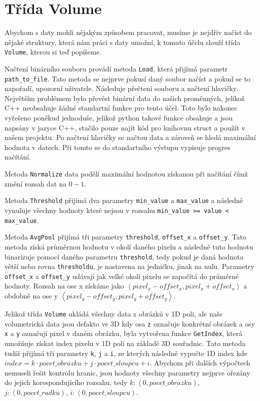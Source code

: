 \section{Třída Volume}
Abychom s daty mohli nějakým způsobem pracovat, musíme je nejdřív načíst do nějaké struktury, která nám práci s daty umožní, k tomuto účelu slouží třída \verb|Volume|, kterou si teď popíšeme.

Načtení binárního souboru provádí metoda \verb|Load|, která přijímá parametr \verb|path_to_file|. Tato metoda se nejprve pokusí daný soubor načíst a pokud se to napořadí, upozorní uživatele. Následuje přečtení souboru a načtení hlavičky. Největším problémem bylo převést binární data do našich proměnných, jelikož C++ neobsahuje žádné standartní funkce pro tento účel. Toto bylo nakonec vyřešeno poněkud jednoduše, jelikož python takové funkce obsahuje a jsou napsány v jazyce C++, stačilo pouze najít kód pro knihovnu struct a použít v našem projektu. Po načtení hlavičky se načtou data a zároveň se hledá maximální hodnota v datech. Při tomto se do standartního výstupu vypisuje progres načítání.

Metoda \verb|Normalize| data podělí maximální hodnotou získanou při načítání čímž změní rozsah dat na $0-1$.

Metoda \verb|Threshold| přijímá dva parametry \verb|min_value| a \verb|max_value| a následně vynuluje všechny hodnoty které nejsou v rozsahu \verb|min_value >= value < max_value|.

Metoda \verb|AvgPool| přijímá tři parametry \verb|threshold|, \verb|offset_x| a \verb|offset_y|. Tato metoda získá průměrnou hodnotu v okolí daného pixelu a následně tuto hodnotu binarizuje pomocí daného parametru \verb|threshold|, tedy pokud je daná hodnota větší nebo rovna \verb|thresholdu|, je nastavena na jedničku, jinak na nulu. Parametry \verb|offset_x| a \verb|offset_y| udávají jak velké okolí pixelu se započítá do průměrné hodnoty. Rozsah na ose x získáme jako $\left<pixel_x - offset_x, pixel_x + offset_x\right>$ a obdobně na ose y $\left<pixel_y - offset_y, pixel_y + offset_y\right>$.

Jelikož třída \verb|Volume| ukládá všechny data z obrázků v 1D poli, ale naše volumetrická data jsou defakto ve 3D kdy osa \verb|z| označuje konkrétní obrázek a osy \verb|x| a \verb|y| označují pixel v daném obrázku, byla vytvořena funkce \verb|GetIndex|, která umožňuje získat index pixelu v 1D poli na základě 3D souřadnic. Tato metoda tudíž přijímá tři parametry \verb|k|, \verb|j| a \verb|i|, ze kterých následně vypočte 1D index kde $index = k \cdot pocet\_obrazku + j \cdot pocet\_sloupcu + i$. Abychom při dalších výpočtech nemuseli řešit kontrolu hranic, jsou hodnoty všechny parametry nejprve ořezány do jejich korespondujícího rozsahu, tedy $k: \left<0, pocet\_obrazku\right)$, $j: \left<0, pocet\_radku\right)$, $i: \left<0, pocet\_sloupcu\right)$.

